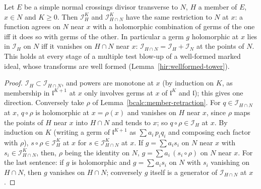 \begin{lemma}
\label{bcalc:member-trace-ideal}
\mixedleanok
Let \(E\) be a simple normal crossings divisor transverse to \(N\), \(H\) a member of \(E\), \(x\in N\) and \(K\ge0\). Then \(\mathcal I_H^K\) and
\(\mathcal I_{H\cap N}^K\) have the same restriction to \(N\) at \(x\): a function agrees on \(N\) near \(x\) with a holomorphic combination of germs of the one
iff it does so with germs of the other. In particular a germ \(g\) holomorphic at \(x\) lies in \(\mathcal I_H\) on \(N\) iff it vanishes on \(H\cap N\) near \(x\):
\(\mathcal I_{H\cap N}=\mathcal I_H+\mathcal I_N\) at the points of \(N\). This holds at every stage of a multiple test blow-up of a well-formed marked ideal, whose
transforms are well formed (Lemma~\ref{hir:wellformed-tower}).
\end{lemma}
\begin{proof}
\mixedleanok
\(\mathcal I_H\subset\mathcal I_{H\cap N}\), and powers are monotone at \(x\) (by induction on \(K\), as membership in \(\mathfrak l^{K+1}\) at \(x\) only involves
germs at \(x\) of \(\mathfrak l^K\) and \(\mathfrak l\)); this gives one direction. Conversely take \(\rho\) of Lemma~\ref{bcalc:member-retraction}. For
\(q\in\mathcal I_{H\cap N}\) at \(x\), \(q\circ\rho\) is holomorphic at \(x=\rho(x)\) and vanishes on \(H\) near \(x\), since \(\rho\) maps the points of \(H\) near \(x\)
into \(H\cap N\) and tends to \(x\); so \(q\circ\rho\in\mathcal I_H\) at \(x\). By induction on \(K\) (writing a germ of \(\mathfrak l^{K+1}\) as \(\sum a_i\,p_iq_i\) and
composing each factor with \(\rho\)), \(s\circ\rho\in\mathcal I_H^K\) at \(x\) for \(s\in\mathcal I_{H\cap N}^K\) at \(x\). If \(g=\sum a_is_i\) on \(N\) near \(x\) with
\(s_i\in\mathcal I_{H\cap N}^K\), then, \(\rho\) being the identity on \(N\), \(g=\sum a_i\,(s_i\circ\rho)\) on \(N\) near \(x\). For the last sentence: if \(g\) is
holomorphic and \(g=\sum a_is_i\) on \(N\) with \(s_i\) vanishing on \(H\cap N\), then \(g\) vanishes on \(H\cap N\); conversely \(g\) itself is a generator of
\(\mathcal I_{H\cap N}\) at \(x\).
\end{proof}

